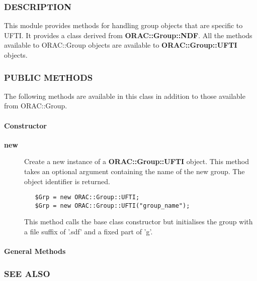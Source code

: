 \begin{description}
\subsubsection*{DESCRIPTION\label{ORAC::Group::UFTI_DESCRIPTION}}


This module provides methods for handling group objects that
are specific to UFTI. It provides a class derived from \textbf{ORAC::Group::NDF}.
All the methods available to ORAC::Group objects are available
to \textbf{ORAC::Group::UFTI} objects.

\subsubsection*{PUBLIC METHODS\label{ORAC::Group::UFTI_PUBLIC_METHODS}}


The following methods are available in this class in addition to
those available from ORAC::Group.

\paragraph*{Constructor\label{ORAC::Group::UFTI_Constructor}}
\begin{description}

\item[{\textbf{new}}] \mbox{}

Create a new instance of a \textbf{ORAC::Group::UFTI} object.
This method takes an optional argument containing the
name of the new group. The object identifier is returned.

\begin{verbatim}
   $Grp = new ORAC::Group::UFTI;
   $Grp = new ORAC::Group::UFTI("group_name");
\end{verbatim}


This method calls the base class constructor but initialises
the group with a file suffix of '.sdf' and a fixed part
of 'g'.

\end{description}
\paragraph*{General Methods\label{ORAC::Group::UFTI_General_Methods}}
\subsubsection*{SEE ALSO\label{ORAC::Group::UFTI_SEE_ALSO}}



\end{description}
